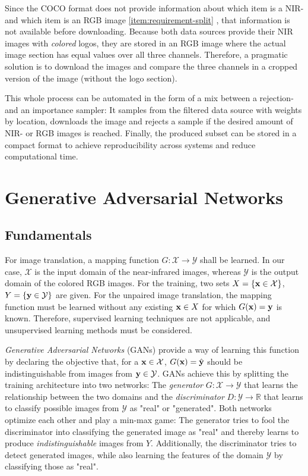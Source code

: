 Since the COCO format does not provide information about which item is a NIR- and which item is an RGB image \ref{item:requirement-split} \parencite{caltech}, that information is not available before downloading.
Because both data sources provide their NIR images with \textit{colored} logos, they are stored in an RGB image where the actual image section has equal values over all three channels.
Therefore, a pragmatic solution is to download the images and compare the three channels in a cropped version of the image (without the logo section).

This whole process can be automated in the form of a mix between a rejection- and an importance sampler:
It samples from the filtered data source with weights by location, downloads the image and rejects a sample if the desired amount of NIR- or RGB images is reached.
Finally, the produced subset can be stored in a compact format to achieve reproducibility across systems and reduce computational time.

\section{Generative Adversarial Networks}

\subsection{Fundamentals}

For image translation, a mapping function $G: \mathcal{X} \to \mathcal{Y}$ shall be learned.
In our case, $\mathcal{X}$ is the input domain of the near-infrared images, whereas $\mathcal{Y}$ is the output domain of the colored RGB images.
For the training, two sets $X = \{\mathbf{x} \in \mathcal{X}\}$, $Y = \{\mathbf{y} \in \mathcal{Y}\}$ are given.
For the unpaired image translation, the mapping function must be learned without any existing $\mathbf{x} \in X$ for which $G(\mathbf{x})=\mathbf{y}$ is known.
Therefore, supervised learning techniques are not applicable, and unsupervised learning methods must be considered.

\textit{Generative Adversarial Networks} (GANs) provide a way of learning this function by declaring the objective that, for a $\mathbf{x} \in \mathcal{X}$, $G(\mathbf{x}) = \hat{\mathbf{y}}$
should be indistinguishable from images from $\mathbf{y} \in \mathcal{Y}$. GANs achieve this by splitting the training architecture into two networks:
The \textit{generator} $G: \mathcal{X} \to \mathcal{Y}$ that learns the relationship between the two domains and the \textit{discriminator} $D: \mathcal{Y} \to \mathbb{R}$ that learns to
classify possible images from $\mathcal{Y}$ as "real" or "generated".
Both networks optimize each other and play a min-max game:
The generator tries to fool the discriminator into classifying the generated image as "real" and thereby learns to produce \textit{indistinguishable} images from $Y$.
Additionally, the discriminator tries to detect generated images, while also learning the features of the domain $\mathcal{Y}$ by classifying those as "real".

